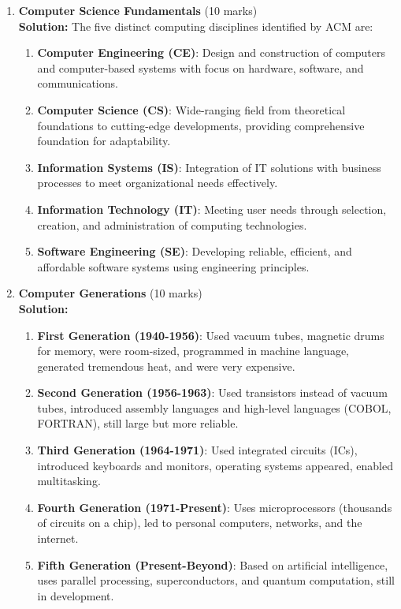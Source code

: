 \documentclass[12pt]{article}
\begin{document}
\begin{enumerate}[left=0pt, label=\bfseries Q\arabic*., start=1]
    \item \textbf{Computer Science Fundamentals} \hfill (10 marks)\\
    \textbf{Solution:} The five distinct computing disciplines identified by ACM are:
    \begin{enumerate}[label=(\alph*)]
        \item \textbf{Computer Engineering (CE)}: Design and construction of computers and computer-based systems with focus on hardware, software, and communications.
        \item \textbf{Computer Science (CS)}: Wide-ranging field from theoretical foundations to cutting-edge developments, providing comprehensive foundation for adaptability.
        \item \textbf{Information Systems (IS)}: Integration of IT solutions with business processes to meet organizational needs effectively.
        \item \textbf{Information Technology (IT)}: Meeting user needs through selection, creation, and administration of computing technologies.
        \item \textbf{Software Engineering (SE)}: Developing reliable, efficient, and affordable software systems using engineering principles.
    \end{enumerate}

    \item \textbf{Computer Generations} \hfill (10 marks)\\
    \textbf{Solution:}
    \begin{enumerate}[label=(\alph*)]
        \item \textbf{First Generation (1940-1956)}: Used vacuum tubes, magnetic drums for memory, were room-sized, programmed in machine language, generated tremendous heat, and were very expensive.
        \item \textbf{Second Generation (1956-1963)}: Used transistors instead of vacuum tubes, introduced assembly languages and high-level languages (COBOL, FORTRAN), still large but more reliable.
        \item \textbf{Third Generation (1964-1971)}: Used integrated circuits (ICs), introduced keyboards and monitors, operating systems appeared, enabled multitasking.
        \item \textbf{Fourth Generation (1971-Present)}: Uses microprocessors (thousands of circuits on a chip), led to personal computers, networks, and the internet.
        \item \textbf{Fifth Generation (Present-Beyond)}: Based on artificial intelligence, uses parallel processing, superconductors, and quantum computation, still in development.
    \end{enumerate}


\end{enumerate}
\end{document}
